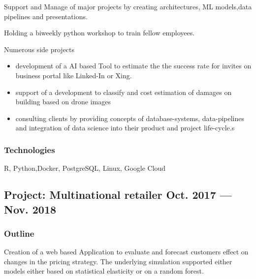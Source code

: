 \documentclass[letter,10pt]{article}
\begin{document}
\begin{zitemize}
\item Support and Manage of major projects by creating architectures, ML models,data pipelines and presentations. \item Holding a biweekly python workshop to train fellow employees.  
\item Numerous side projects \begin{itemize}
	\item development of a AI based Tool to estimate the the success rate for invites on business portal like Linked-In or Xing.
	\item support of a development to classify and cost estimation of damages on building based on drone images
	\item consulting clients by providing concepts of database-systems, data-pipelines and integration of data science into their product and project life-cycle.s
\end{itemize}
\end{zitemize}

\subsubsection*{{Technologies}}
R, Python,Docker, PostgreSQL, Linux, Google Cloud

\vspace{1em}

\subsection{{Project: Multinational retailer  \hfill Oct.  2017 --- Nov. 2018 }}
\subsubsection*{{Outline}}
Creation of a web based Application to evaluate and forecast customers effect on changes in the pricing strategy. The underlying simulation supported either models either based on statistical elasticity or on a random forest. 
\end{document}
